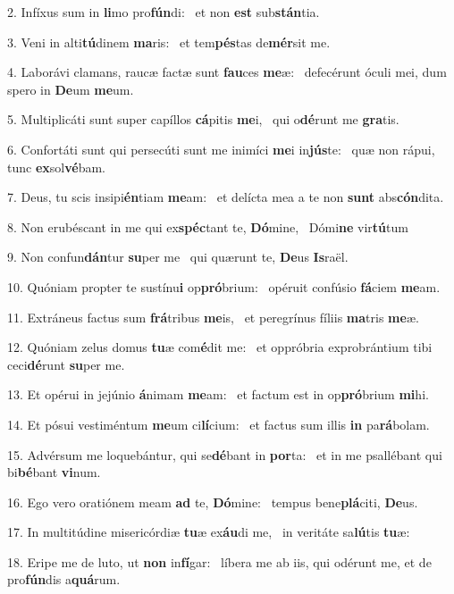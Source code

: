 2. Infíxus sum in \textbf{li}mo pro\textbf{fún}di: \ast\  et non \textbf{est} sub\textbf{stán}tia.\

3. Veni in alti\textbf{tú}dinem \textbf{ma}ris: \ast\  et tem\textbf{pés}tas de\textbf{mér}sit me.\

4. Laborávi clamans, raucæ factæ sunt \textbf{fau}ces \textbf{me}æ: \ast\  defecérunt óculi mei, dum spero in \textbf{De}um \textbf{me}um.\

5. Multiplicáti sunt super capíllos \textbf{cá}pitis \textbf{me}i, \ast\  qui o\textbf{dé}runt me \textbf{gra}tis.\

6. Confortáti sunt qui persecúti sunt me inimíci \textbf{me}i in\textbf{jús}te: \ast\  quæ non rápui, tunc \textbf{ex}sol\textbf{vé}bam.\

7. Deus, tu scis insipi\textbf{én}tiam \textbf{me}am: \ast\  et delícta mea a te non \textbf{sunt} abs\textbf{cón}dita.\

8. Non erubéscant in me qui ex\textbf{spéc}tant te, \textbf{Dó}mine, \ast\  Dómi\textbf{ne} vir\textbf{tú}tum\

9. Non confun\textbf{dán}tur \textbf{su}per me \ast\  qui quærunt te, \textbf{De}us \textbf{Is}raël.\

10. Quóniam propter te sustínu\textbf{i} op\textbf{pró}brium: \ast\  opéruit confúsio \textbf{fá}ciem \textbf{me}am.\

11. Extráneus factus sum \textbf{frá}tribus \textbf{me}is, \ast\  et peregrínus fíliis \textbf{ma}tris \textbf{me}æ.\

12. Quóniam zelus domus \textbf{tu}æ com\textbf{é}dit me: \ast\  et oppróbria exprobrántium tibi ceci\textbf{dé}runt \textbf{su}per me.\

13. Et opérui in jejúnio \textbf{á}nimam \textbf{me}am: \ast\  et factum est in op\textbf{pró}brium \textbf{mi}hi.\

14. Et pósui vestiméntum \textbf{me}um ci\textbf{lí}cium: \ast\  et factus sum illis \textbf{in} pa\textbf{rá}bolam.\

15. Advérsum me loquebántur, qui se\textbf{dé}bant in \textbf{por}ta: \ast\  et in me psallébant qui bi\textbf{bé}bant \textbf{vi}num.\

16. Ego vero oratiónem meam \textbf{ad} te, \textbf{Dó}mine: \ast\  tempus bene\textbf{plá}citi, \textbf{De}us.\

17. In multitúdine misericórdiæ \textbf{tu}æ ex\textbf{áu}di me, \ast\  in veritáte sa\textbf{lú}tis \textbf{tu}æ:\

18. Eripe me de luto, ut \textbf{non} in\textbf{fí}gar: \ast\  líbera me ab iis, qui odérunt me, et de pro\textbf{fún}dis a\textbf{quá}rum.\


